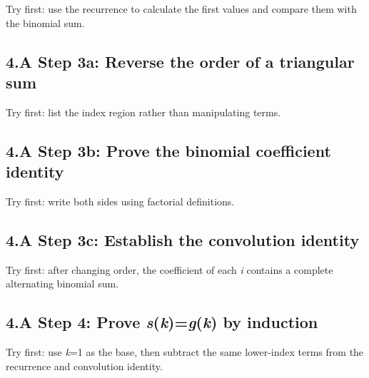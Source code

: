 \documentclass[11pt]{article}
\begin{document}
\begin{keepsection}
\begin{keepsection}
Try first: use the recurrence to calculate the first values and compare them with the binomial sum.

\end{keepsection}

\begin{keepsection}
\subsection{4.A Step 3a: Reverse the order of a triangular sum}

Try first: list the index region rather than manipulating terms.

\end{keepsection}

\begin{keepsection}
\subsection{4.A Step 3b: Prove the binomial coefficient identity}

Try first: write both sides using factorial definitions.

\end{keepsection}

\begin{keepsection}
\subsection{4.A Step 3c: Establish the convolution identity}

Try first: after changing order, the coefficient of each \textit{i} contains a complete alternating binomial sum.

\end{keepsection}

\begin{keepsection}
\subsection{4.A Step 4: Prove \textit{s}(\textit{k})=\textit{g}(\textit{k}) by induction}

Try first: use \textit{k}=1 as the base, then subtract the same lower-index terms from the recurrence and convolution identity.

\end{keepsection}
\end{keepsection}
\end{document}

